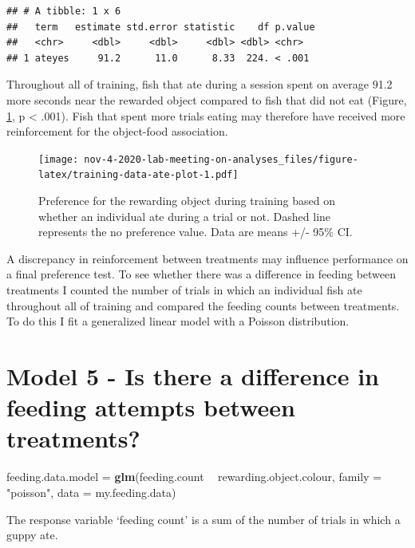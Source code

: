 \documentclass[]{book}
\newenvironment{Shaded}{\begin{snugshade}}{\end{snugshade}}
\newcommand{\KeywordTok}[1]{\textcolor[rgb]{0.13,0.29,0.53}{\textbf{#1}}}
\newcommand{\DataTypeTok}[1]{\textcolor[rgb]{0.13,0.29,0.53}{#1}}
\newcommand{\StringTok}[1]{\textcolor[rgb]{0.31,0.60,0.02}{#1}}
\newcommand{\OperatorTok}[1]{\textcolor[rgb]{0.81,0.36,0.00}{\textbf{#1}}}
\newcommand{\NormalTok}[1]{#1}
\begin{document}
\begin{verbatim}
## # A tibble: 1 x 6
##   term   estimate std.error statistic    df p.value
##   <chr>     <dbl>     <dbl>     <dbl> <dbl> <chr>  
## 1 ateyes     91.2      11.0      8.33  224. < .001
\end{verbatim}

Throughout all of training, fish that ate during a session spent on
average 91.2 more seconds near the rewarded object compared to fish that
did not eat (Figure, \ref{fig:training-data-ate-plot}, p \textless{}
.001). Fish that spent more trials eating may therefore have received
more reinforcement for the object-food association.

\begin{figure}
\centering
\texttt{[image: nov-4-2020-lab-meeting-on-analyses\_files/figure-latex/training-data-ate-plot-1.pdf]}
\caption{\label{fig:training-data-ate-plot}Preference for the rewarding
object during training based on whether an individual ate during a trial
or not. Dashed line represents the no preference value. Data are means
+/- 95\% CI.}
\end{figure}

A discrepancy in reinforcement between treatments may influence
performance on a final preference test. To see whether there was a
difference in feeding between treatments I counted the number of trials
in which an individual fish ate throughout all of training and compared
the feeding counts between treatments. To do this I fit a generalized
linear model with a Poisson distribution.

\chapter{Model 5 - Is there a difference in feeding attempts between
treatments?}\label{model-5---is-there-a-difference-in-feeding-attempts-between-treatments}

\begin{Shaded}
\begin{Highlighting}[]
\NormalTok{feeding.data.model =}\StringTok{ }
\StringTok{  }\KeywordTok{glm}\NormalTok{(feeding.count }\OperatorTok{~}\StringTok{ }\NormalTok{rewarding.object.colour, }\DataTypeTok{family =} \StringTok{"poisson"}\NormalTok{, }
      \DataTypeTok{data =}\NormalTok{ my.feeding.data)}
\end{Highlighting}
\end{Shaded}

The response variable `feeding count' is a sum of the number of trials
in which a guppy ate.
\end{document}
